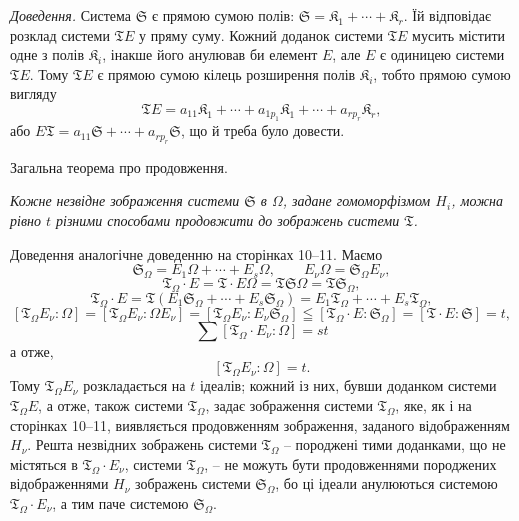 \documentclass[11pt]{article}
\begin{document}
\emph{Доведення.} Система \(\mathfrak S\) є прямою сумою полів: \(\mathfrak S=\mathfrak K_1+\cdots+\mathfrak K_r\). Їй відповідає розклад системи \(\mathfrak T E\) у пряму суму. Кожний доданок системи \(\mathfrak T E\) мусить містити одне з полів \(\mathfrak K_i\), інакше його анулював би елемент \(E\), але \(E\) є одиницею системи \(\mathfrak T E\). Тому \(\mathfrak T E\) є прямою сумою кілець розширення полів \(\mathfrak K_i\), тобто прямою сумою вигляду
\[
\mathfrak T E=a_{11}\mathfrak K_1+\cdots+a_{1p_1}\mathfrak K_1+\cdots+a_{rp_r}\mathfrak K_r,
\]
або \(E\mathfrak T=a_{11}\mathfrak S+\cdots+a_{rp_r}\mathfrak S\), що й треба було довести.

\begin{center}
Загальна теорема про продовження.
\end{center}

\emph{Кожне незвідне зображення системи \(\mathfrak S\) в \(\Omega\), задане гомоморфізмом \(H_i\), можна рівно \(t\) різними способами продовжити до зображень системи \(\mathfrak T\).}

Доведення аналогічне доведенню на сторінках 10--11. Маємо
\[
\mathfrak S_\Omega=E_1\Omega+\cdots+E_s\Omega,\qquad
E_\nu\Omega=\mathfrak S_\Omega E_\nu,
\]
\[
\mathfrak T_\Omega\cdot E=\mathfrak T\cdot E\Omega
=\mathfrak T\mathfrak S\Omega=\mathfrak T\mathfrak S_\Omega,
\]
\[
\mathfrak T_\Omega\cdot E
=\mathfrak T(E_1\mathfrak S_\Omega+\cdots+E_s\mathfrak S_\Omega)
=E_1\mathfrak T_\Omega+\cdots+E_s\mathfrak T_\Omega,
\]
\[
[\mathfrak T_\Omega E_\nu:\Omega]
=[\mathfrak T_\Omega E_\nu:\Omega E_\nu]
=[\mathfrak T_\Omega E_\nu:E_\nu\mathfrak S_\Omega]
\leqq[\mathfrak T_\Omega\cdot E:\mathfrak S_\Omega]
=[\mathfrak T\cdot E:\mathfrak S]=t,
\]
\[
\sum[\mathfrak T_\Omega\cdot E_\nu:\Omega]=st
\]
а отже,
\[
[\mathfrak T_\Omega E_\nu:\Omega]=t.
\]
Тому \(\mathfrak T_\Omega E_\nu\) розкладається на \(t\) ідеалів; кожний із них, бувши доданком системи \(\mathfrak T_\Omega E\), а отже, також системи \(\mathfrak T_\Omega\), задає зображення системи \(\mathfrak T_\Omega\), яке, як і на сторінках 10--11, виявляється продовженням зображення, заданого відображенням \(H_\nu\). Решта незвідних зображень системи \(\mathfrak T_\Omega\) -- породжені тими доданками, що не містяться в \(\mathfrak T_\Omega\cdot E_\nu\), системи \(\mathfrak T_\Omega\), -- не можуть бути продовженнями породжених відображеннями \(H_\nu\) зображень системи \(\mathfrak S_\Omega\), бо ці ідеали анулюються системою \(\mathfrak T_\Omega\cdot E_\nu\), а тим паче системою \(\mathfrak S_\Omega\).
\end{document}
